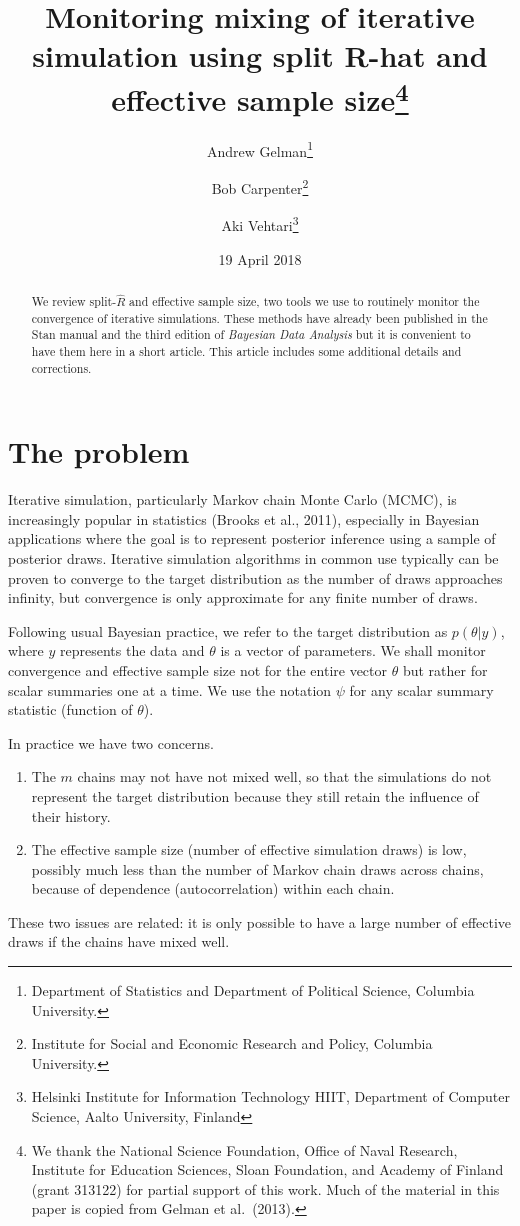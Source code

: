 \documentclass[11pt]{article}
\title{\bf Monitoring mixing of iterative simulation using split R-hat and effective sample size\footnote{We thank the National Science Foundation, Office of Naval Research, Institute for Education Sciences, Sloan Foundation, and Academy of Finland (grant 313122) for partial support of this work. Much of the material in this paper is copied from Gelman et al.\ (2013).}\vspace{.1in}}
\author{Andrew Gelman\footnote{Department of Statistics and Department of Political Science, Columbia University.} \and Bob Carpenter\footnote{Institute for Social and Economic Research and Policy, Columbia University.} \and Aki Vehtari\footnote{Helsinki Institute for Information Technology HIIT,
           Department of Computer Science, Aalto University,
           Finland}}
\date{19 April 2018\vspace{-.1in}}
\begin{document}
\sloppy
\maketitle
\thispagestyle{empty}

\begin{abstract}
We review split-$\widehat{R}$ and effective sample size, two tools we use to routinely monitor the convergence of iterative simulations.  These methods have already been published in the Stan manual and the third edition of {\em Bayesian Data Analysis} but it is convenient to have them here in a short article. This article includes some additional details and corrections. 
\end{abstract}

\section{The problem}\label{intro}

Iterative simulation, particularly Markov chain Monte Carlo (MCMC), is increasingly popular in statistics (Brooks et al., 2011), especially in Bayesian applications where the goal is to represent posterior inference using a sample of posterior draws.  Iterative simulation algorithms in common use typically can be proven to converge to the target distribution as the number of draws approaches infinity, but convergence is only approximate for any finite number of draws.

Following usual Bayesian practice, we refer to the target distribution as $p(\theta|y)$, where $y$ represents the data and $\theta$ is a vector of parameters.  We shall monitor convergence and effective sample size not for the entire vector $\theta$ but rather for scalar summaries one at a time.  We use the notation $\psi$ for any scalar summary statistic (function of $\theta$).

In practice we have two concerns.
\begin{enumerate}
\item The $m$ chains may not have not mixed well, so that the simulations do not represent the target distribution because they still retain the influence of their history.
\item The effective sample size (number of effective simulation draws) is low, possibly much less than the number of Markov chain draws across chains, because of dependence (autocorrelation) within each chain.
\end{enumerate}
%
These two issues are related: it is only possible to have a large number of effective draws if the chains have mixed well.
\end{document}
